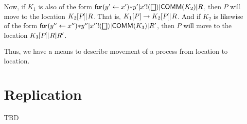 Now, if $K_{1}$ is also of the form $\binpar{\binpar{\binpar{\prefix{x'}{y'}{\dropn{y'}}}{\outputp{x'}{\bigbox}}}{\mathsf{COMM}(K_{2})}}{R}$, then $P$ will move to the location $\binpar{K_{2}[P]}{R}$. That is, $K_{1}[P] \red \binpar{K_{2}[P]}{R}$. And if $K_{2}$ is likewise of the form $\binpar{\binpar{\binpar{\prefix{x''}{y''}{\dropn{y''}}}{\outputp{x''}{\bigbox}}}{\mathsf{COMM}(K_{3})}}{R'}$, then $P$ will move to the location $\binpar{K_{3}[P]}{\binpar{R}{R'}}$.

Thus, we have a means to describe movement of a process from location to location.




\section{Replication}
TBD



